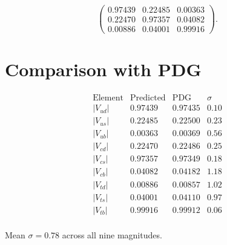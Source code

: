 \[
\begin{pmatrix}
0.97439 & 0.22485 & 0.00363 \\
0.22470 & 0.97357 & 0.04082 \\
0.00886 & 0.04001 & 0.99916
\end{pmatrix}.
\]

\section{Comparison with PDG}

\[
\begin{array}{lccc}
\text{Element} & \text{Predicted} & \text{PDG} & \sigma \\
\hline
|V_{ud}| & 0.97439 & 0.97435 & 0.10 \\
|V_{us}| & 0.22485 & 0.22500 & 0.23 \\
|V_{ub}| & 0.00363 & 0.00369 & 0.56 \\
|V_{cd}| & 0.22470 & 0.22486 & 0.25 \\
|V_{cs}| & 0.97357 & 0.97349 & 0.18 \\
|V_{cb}| & 0.04082 & 0.04182 & 1.18 \\
|V_{td}| & 0.00886 & 0.00857 & 1.02 \\
|V_{ts}| & 0.04001 & 0.04110 & 0.97 \\
|V_{tb}| & 0.99916 & 0.99912 & 0.06 \\
\end{array}
\]

Mean \(\sigma = 0.78\) across all nine magnitudes.
